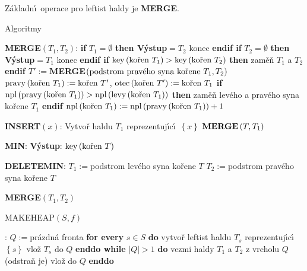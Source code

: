 \flushpar Z\'akladn\'\i\ operace pro leftist haldy je {\bf MERGE}.
\bigskip

\subhead
Algoritmy
\endsubhead
\medskip

{\bf MERGE$\left(T_1,T_2\right)$}:\newline 
{\bf if} $T_1=\emptyset$ {\bf then V\'ystup$=T_2$} konec {\bf endif\newline 
if} $T_2=\emptyset$ {\bf then V\'ystup$=T_1$} konec {\bf endif\newline 
if} $\key\left(\text{\rm ko\v ren }T_1\right)>\key\left(\text{\rm ko\v ren }T_2\right)$ {\bf then\newline}
\phantom{---}zam\v e\v n $T_1$ a $T_2$\newline 
{\bf endif\newline 
$T':=$MERGE$\left(\text{{\rm podstrom prav\'eho syna ko\v rene }}T_1,T_
2\right)$\newline 
$\pravy\left(\text{{\rm {\rm ko\v ren }}}T_1\right):=\text{{\rm {\rm ko\v ren }}}
T'$}, 
$\otec\left(\text{\rm ko\v ren }T'\right):=\text{\rm ko\v ren }T_1$\newline 
{\bf if} $\npl\left(\pravy\left(\text{\rm ko\v ren }T_1\right)\right)>\npl\left(\levy\left(\text{\rm ko\v ren }
T_1\right)\right)$ {\bf then}\newline
\phantom{---}zam\v e\v n lev\'eho a prav\'eho syna ko\v rene $T_1$\newline 
{\bf endif\newline 
$\npl\left(\text{{\rm {\rm ko\v ren }}}T_1\right):=\npl\left(\pravy\left(\text{{\rm {\rm ko\v ren }}}
T_1\right)\right)+1$}
\bigskip

{\bf INSERT$\left(x\right)$}:\newline 
Vytvo\v r haldu $T_1$ reprezentuj\'\i c\'\i\ $\left\{x\right\}$\newline 
$\bold M\bold E\bold R\bold G\bold E\left(T,T_1\right)$
\bigskip

{\bf MIN}:\newline 
{\bf V\'ystup}: $\key\left(\text{\rm ko\v ren }T\right)$
\bigskip

{\bf DELETEMIN}:\newline 
$T_1:=$podstrom lev\'eho syna ko\v rene $T$\newline 
$T_2:=$podstrom prav\'eho syna ko\v rene $T$\newline 
{\bf MERGE$\left(T_1,T_2\right)$
\bigskip

MAKEHEAP$\left(S,f\right)$}:\newline 
$Q:=$pr\'azdn\'a fronta\newline 
{\bf for every} $s\in S$ {\bf do}\newline 
\phantom{---}vytvo\v r leftist haldu $T_s$ reprezentuj\'\i c\'\i\ $\left\{s\right\}$\newline 
\phantom{---}vlo\v z $T_s$ do $Q$\newline 
{\bf enddo\newline 
while} $|Q|>1$ {\bf do}\newline 
\phantom{---}vezmi haldy $T_1$ a $T_2$ z vrcholu $Q$ (odstra\v n je)\newline 
\phantom{---}{\bf MERGE$\left(T_1,T_2\right)$} vlo\v z do $Q$\newline
{\bf enddo}
\bigskip

